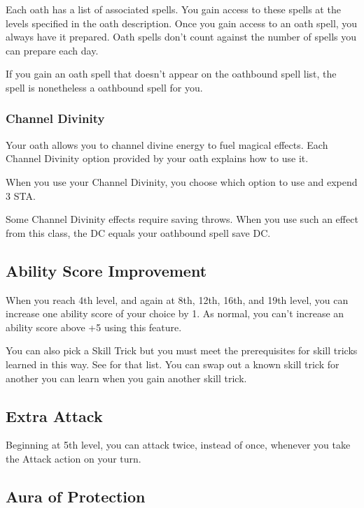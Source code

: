 Each oath has a list of associated spells. You gain access to these spells at the levels specified in the oath description. Once you gain access to an oath spell, you always have it prepared. Oath spells don't count against the number of spells you can prepare each day.

If you gain an oath spell that doesn't appear on the oathbound spell list, the spell is nonetheless a oathbound spell for you.

\subsubsection{Channel Divinity}

Your oath allows you to channel divine energy to fuel magical effects. Each Channel Divinity option provided by your oath explains how to use it.

When you use your Channel Divinity, you choose which option to use and expend 3 STA.

Some Channel Divinity effects require saving throws. When you use such an effect from this class, the DC equals your oathbound spell save DC.

\subsection{Ability Score Improvement}

When you reach 4th level, and again at 8th, 12th, 16th, and 19th level, you can increase one ability score of your choice by 1.  As normal, you can't increase an ability score above +5 using this feature.

You can also pick a Skill Trick but you must meet the prerequisites for skill tricks learned in this way. See  for that list. You can swap out a known skill trick for another you can learn when you gain another skill trick.

\subsection{Extra Attack}

Beginning at 5th level, you can attack twice, instead of once, whenever you take the Attack action on your turn.

\subsection{Aura of Protection}


